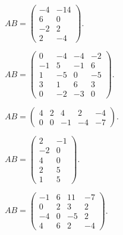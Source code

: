 \documentclass[12pt]{article}
\theoremstyle{remark}
\begin{document}
\begin{description}[style=nextline,leftmargin=3em,itemsep=0.45em]
\item[E122.] $AB=\begin{pmatrix}-4&-14\\6&0\\-2&2\\2&-4\end{pmatrix}$.
\item[E123.] $AB=\begin{pmatrix}0&-4&-4&-2\\-1&5&-1&6\\1&-5&0&-5\\3&1&6&3\\0&-2&-3&0\end{pmatrix}$.
\item[E124.] $AB=\begin{pmatrix}4&2&4&2&-4\\0&0&-1&-4&-7\end{pmatrix}$.
\item[E125.] $AB=\begin{pmatrix}2&-1\\-2&0\\4&0\\2&5\\1&5\end{pmatrix}$.
\item[E126.] $AB=\begin{pmatrix}-1&6&11&-7\\0&2&3&2\\-4&0&-5&2\\4&6&2&-4\end{pmatrix}$.
\end{description}
\end{document}
